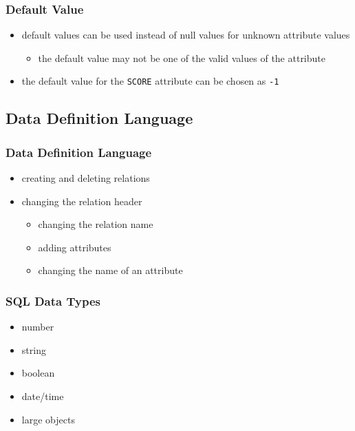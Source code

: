 \documentclass[dvipsnames]{beamer}
\theoremstyle{plain}
\begin{document}
\begin{frame}
  \frametitle{Default Value}

  \begin{itemize}
    \item default values can be used instead of null values for unknown attribute
      values

    \begin{itemize}
      \item the default value may not be one of the valid values of the attribute
    \end{itemize}
  \end{itemize}

  \pause
  \begin{example}
    \begin{itemize}
      \item the default value for the \texttt{SCORE} attribute can be chosen
        as \texttt{-1}
    \end{itemize}
  \end{example}
\end{frame}

\subsection{Data Definition Language}

\begin{frame}
  \frametitle{Data Definition Language}

  \begin{itemize}
    \item creating and deleting relations

    \pause
    \item changing the relation header
    \begin{itemize}
      \item changing the relation name
      \item adding attributes
      \item changing the name of an attribute
    \end{itemize}
  \end{itemize}
\end{frame}

\begin{frame}
  \frametitle{SQL Data Types}

  \begin{itemize}
    \item number
    \item string
    \item boolean
    \item date/time
    \item large objects
  \end{itemize}
\end{frame}
\end{document}
